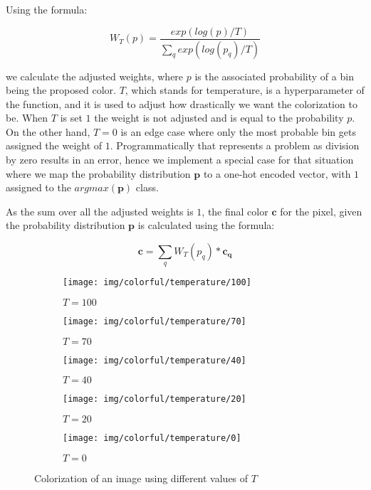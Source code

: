 Using the formula:

\begin{equation}
    W_T(p) = \frac{exp(log(p)/T)}{\sum_{q}{exp(log(p_q)/T)}}\label{eq:annealed_mean}
\end{equation}

we calculate the adjusted weights, where $p$ is the associated 
probability of a bin being the proposed color. $T$, which stands 
for temperature, is a hyperparameter of the function, and it is used to 
adjust how drastically we want the colorization to be. When $T$ is set $1$
the weight is not adjusted and is equal to the probability $p$. On
the other hand, $T=0$ is an edge case where only the most probable bin 
gets assigned the weight of $1$. Programmatically that represents a problem 
as division  by zero results in an error, hence we implement a special case
for that situation where we map the probability distribution $\mathbf{p}$
to a one-hot encoded vector, with $1$ assigned to the $argmax(\mathbf{p})$
class.

As the sum over all the adjusted weights is $1$, the final color $\mathbf{c}$ 
for the pixel, given the probability distribution $\mathbf{p}$ is calculated 
using the formula:

\begin{equation}
    \mathbf{c} = \sum_{q}W_T(p_q) * \mathbf{c_q}\label{eq:weighed sum}
\end{equation}

\begin{figure}[!ht]
	\centering
	\begin{subfigure}{.19\textwidth}
		\centering
		\texttt{[image: img/colorful/temperature/100]}
		\caption{$T=100$}
	\end{subfigure}
	\begin{subfigure}{.19\textwidth}
		\centering
		\texttt{[image: img/colorful/temperature/70]}
		\caption{$T=70$}
	\end{subfigure}
	\begin{subfigure}{.19\textwidth}
		\centering
		\texttt{[image: img/colorful/temperature/40]}
		\caption{$T=40$}
	\end{subfigure}
	\begin{subfigure}{.19\textwidth}
		\centering
		\texttt{[image: img/colorful/temperature/20]}
		\caption{$T=20$}
	\end{subfigure}
	\begin{subfigure}{.19\textwidth}
		\centering
		\texttt{[image: img/colorful/temperature/0]}
		\caption{$T=0$}
	\end{subfigure}
	\caption{Colorization of an image using different values of $T$}
	\label{fig:temperature}
\end{figure}

